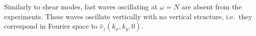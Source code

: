
Similarly to shear modes, fast waves oscillating at $\omega=N$ are absent from
the experiments. These waves oscillate vertically with no vertical structure,
i.e.\ they correspond in Fourier space to $\hat{v}_z(k_x,k_y,0)$.
